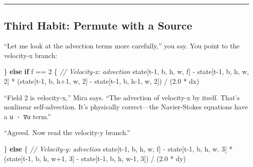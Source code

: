 \documentclass[11pt,]{article}
\newenvironment{Shaded}{}{}
\newcommand{\CommentTok}[1]{\textcolor[rgb]{0.38,0.63,0.69}{\textit{#1}}}
\newcommand{\DecValTok}[1]{\textcolor[rgb]{0.25,0.63,0.44}{#1}}
\newcommand{\KeywordTok}[1]{\textcolor[rgb]{0.00,0.44,0.13}{\textbf{#1}}}
\newcommand{\NormalTok}[1]{#1}
\newcommand{\OperatorTok}[1]{\textcolor[rgb]{0.40,0.40,0.40}{#1}}
\begin{document}
\begin{center}\rule{0.5\linewidth}{0.4pt}\end{center}

\hypertarget{third-habit-permute-with-a-source}{%
\subsection{Third Habit: Permute with a
Source}\label{third-habit-permute-with-a-source}}

``Let me look at the advection terms more carefully,'' you say. You
point to the velocity-x branch:

\begin{Shaded}
\begin{Highlighting}[]
\OperatorTok{\}} \KeywordTok{else} \KeywordTok{if}\NormalTok{ f == }\DecValTok{2} \OperatorTok{\{}
    \CommentTok{// Velocity-x: advection}
\NormalTok{    state}\OperatorTok{[}\NormalTok{t-}\DecValTok{1}\NormalTok{, b, h, w, f}\OperatorTok{]}\NormalTok{ -}
\NormalTok{        state}\OperatorTok{[}\NormalTok{t-}\DecValTok{1}\NormalTok{, b, h, w, }\DecValTok{2}\OperatorTok{]}\NormalTok{ *}
\NormalTok{        (state}\OperatorTok{[}\NormalTok{t-}\DecValTok{1}\NormalTok{, b, h+}\DecValTok{1}\NormalTok{, w, }\DecValTok{2}\OperatorTok{]}\NormalTok{ - state}\OperatorTok{[}\NormalTok{t-}\DecValTok{1}\NormalTok{, b, h-}\DecValTok{1}\NormalTok{, w, }\DecValTok{2}\OperatorTok{]}\NormalTok{) / (}\DecValTok{2.0}\NormalTok{ * dx)}
\end{Highlighting}
\end{Shaded}

``Field 2 is velocity-x,'' Mira says. ``The advection of velocity-x by
itself. That's nonlinear self-advection. It's physically correct---the
Navier-Stokes equations have a \texttt{u\ ·\ ∇u} term.''

``Agreed. Now read the velocity-y branch.''

\begin{Shaded}
\begin{Highlighting}[]
\OperatorTok{\}} \KeywordTok{else} \OperatorTok{\{}
    \CommentTok{// Velocity-y: advection}
\NormalTok{    state}\OperatorTok{[}\NormalTok{t-}\DecValTok{1}\NormalTok{, b, h, w, f}\OperatorTok{]}\NormalTok{ -}
\NormalTok{        state}\OperatorTok{[}\NormalTok{t-}\DecValTok{1}\NormalTok{, b, h, w, }\DecValTok{3}\OperatorTok{]}\NormalTok{ *}
\NormalTok{        (state}\OperatorTok{[}\NormalTok{t-}\DecValTok{1}\NormalTok{, b, h, w+}\DecValTok{1}\NormalTok{, }\DecValTok{3}\OperatorTok{]}\NormalTok{ - state}\OperatorTok{[}\NormalTok{t-}\DecValTok{1}\NormalTok{, b, h, w-}\DecValTok{1}\NormalTok{, }\DecValTok{3}\OperatorTok{]}\NormalTok{) / (}\DecValTok{2.0}\NormalTok{ * dy)}
\end{Highlighting}
\end{Shaded}
\end{document}
